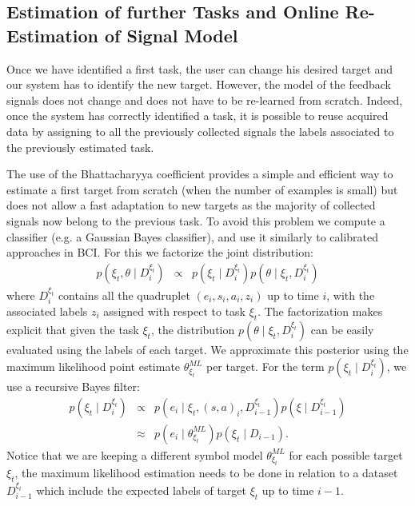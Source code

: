 \documentclass[letterpaper]{article}
\begin{document}
\subsection{Estimation of further Tasks and Online Re-Estimation of Signal Model}
\label{sec:AlgReUse}

Once we have identified a first task, the user can change his desired target and our system has to identify the new target. However, the model of the feedback signals does not change and does not have to be re-learned from scratch. Indeed, once the system has correctly identified a task, it is possible to reuse acquired data by assigning to all the previously collected signals the labels associated to the previously estimated task. 

The use of the Bhattacharyya coefficient provides a simple and efficient way to estimate a first target from scratch (when the number of examples is small) but does not allow a fast adaptation to new targets as the majority of collected signals now belong to the previous task. To avoid this problem we compute a classifier (e.g. a Gaussian Bayes classifier), and use it similarly to calibrated approaches in BCI. For this we factorize the joint distribution:
%
\begin{eqnarray}
p(\xi_t, \theta \mid D^{\xi_t}_i) & \propto & p(\xi_t \mid D^{\xi_t}_i)p(\theta \mid \xi_t, D^{\xi_t}_i)
\end{eqnarray}
%
where $D^{\xi_t}_i$ contains all the quadruplet $(e_i,s_i,a_i,z_i)$ up to time $i$, with the associated labels $z_i$ assigned with respect to task $\xi_t$. The factorization makes explicit that given the task $\xi_t$, the distribution $p(\theta \mid \xi_t, D^{\xi_t}_i)$ can be easily evaluated using the labels of each target. We approximate this posterior using the maximum likelihood point estimate $\theta^{ML}_{\xi_t}$ per target. For the term $p(\xi_t \mid D^{\xi_t}_i)$, we use a recursive Bayes filter:
%
\begin{eqnarray}
p(\xi_t \mid D^{\xi_t}_i) &\propto & p(e_i \mid \xi_t, (s,a)_i,D^{\xi_t}_{i-1})p(\xi \mid D^{\xi_t}_{i-1}) \nonumber\\
& \approx & p(e_i\mid \theta^{ML}_{\xi_t})p(\xi_t \mid D_{i-1}).
\label{eq:taskprob}
\end{eqnarray}
%
Notice that we are keeping a different symbol model  $\theta^{ML}_{\xi_t}$  for each possible target $\xi_t$, the maximum likelihood estimation needs to be done in relation to a dataset $D^{\xi_t}_{i-1}$ which include the expected labels of target $\xi_t$ up to time $i-1$. 
\end{document}

